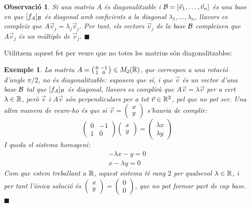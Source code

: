 \documentclass[
  11pt,
]{book}
\numberwithin{dummy}{section}
\theoremstyle{maincolornumbox}
\newtheorem{remarkT}{Observació}[chapter]
\theoremstyle{blacknumex}
\newtheorem{exampleT}{Exemple}[chapter]
\theoremstyle{blacknumbox}
\theoremstyle{maincolornum}
\newenvironment{example}{\begin{exampleT}}{\hfill{\tiny\ensuremath{\blacksquare}}\end{exampleT}}
\newenvironment{remark}{\begin{remarkT}}{\hfill{\tiny\ensuremath{\blacksquare}}\end{remarkT}}
\newlength\esp
\begin{document}
\begin{remark}
Si una matriu \(A\)
és diagonalitzable i \(\mathcal{B}=[\vec v_1, \dots, \vec v_n]\) és una base en
que \([f_A]_{\mathcal{B}}\) és diagonal amb coeficients a la diagonal
\(\lambda_1, \dots, \lambda_n\), llavors es compleix que
\(A \vec v_j=\lambda_j \vec v_j\). Per tant, els vectors \(\vec v_j\) de la
base \(\mathcal{B}\) compleixen que \(A\vec v_j\) és un múltiple de \(\vec v_j\).
\end{remark}

Utilitzem aquest fet per veure que no totes les matrius són
diagonalitzables:

\begin{example}
La matriu
\(A=\left(\begin{smallmatrix} 0 & -1 \\ 1 & 0\end{smallmatrix}\right)\in M_2(\mathbb{R})\),
que correspon a una rotació d'angle \(\pi/2\), no és diagonalitzable:
suposem que sí, i que \(\vec v\) és un vector d'una base \(\mathcal{B}\) tal que
\([f_A]_{\mathcal{B}}\) és diagonal, llavors es complirà que
\(A\vec v=\lambda \vec v\) per a cert \(\lambda\in \mathbb{R}\), però \(\vec v\) i
\(A\vec v\) són perpendiculars per a tot \(\vec v \in \mathbb{R}^2\), pel que no pot
ser. Una altra manera de veure-ho és que si
\(\vec v=\left(\begin{smallmatrix} x \\ y \end{smallmatrix}\right)\)
s'hauria de complir: \[\begin{pmatrix}
0 & -1 \\ 1 & 0 
\end{pmatrix}
\begin{pmatrix}
x \\ y 
\end{pmatrix} =
\begin{pmatrix}
\lambda x \\ \lambda y 
\end{pmatrix}\] I queda el sistema homogeni: \begin{align*}
    -\lambda x - y =0 \\
    x - \lambda y=0
\end{align*} Com que estem treballant a \(\mathbb{R}\), aquest sistema té rang
\(2\) per qualsevol \(\lambda\in\mathbb{R}\), i per tant l'única solució és
\(\left(\begin{smallmatrix} x \\ y \end{smallmatrix}\right)=\left(\begin{smallmatrix} 0 \\ 0 \end{smallmatrix}\right)\),
que no pot formar part de cap base.
\end{example}
\end{document}
